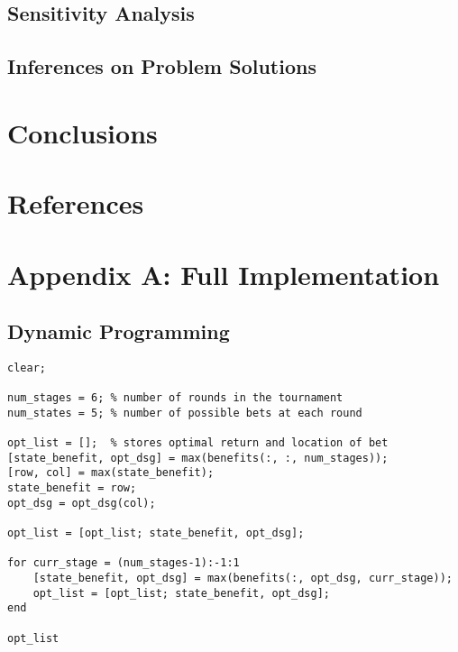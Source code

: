\documentclass[12pt]{article}
\begin{document}
\subsection{Sensitivity Analysis}


\subsection{Inferences on Problem Solutions}

\newpage
\section{Conclusions}

\newpage
\section{References}



\newpage
\section{Appendix A: Full Implementation}
\subsection{Dynamic Programming}
\begin{verbatim}
clear;

num_stages = 6;	% number of rounds in the tournament
num_states = 5;	% number of possible bets at each round

opt_list = [];	% stores optimal return and location of bet
[state_benefit, opt_dsg] = max(benefits(:, :, num_stages));
[row, col] = max(state_benefit);
state_benefit = row;
opt_dsg = opt_dsg(col);

opt_list = [opt_list; state_benefit, opt_dsg];

for curr_stage = (num_stages-1):-1:1
	[state_benefit, opt_dsg] = max(benefits(:, opt_dsg, curr_stage));
	opt_list = [opt_list; state_benefit, opt_dsg];
end

opt_list
\end{verbatim}
\end{document}
